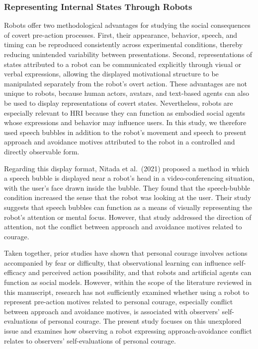 \subsubsection{Representing Internal States Through
Robots}\label{representing-internal-states-through-robots}

Robots offer two methodological advantages for studying the social
consequences of covert pre-action processes. First, their appearance,
behavior, speech, and timing can be reproduced consistently across
experimental conditions, thereby reducing unintended variability between
presentations. Second, representations of states attributed to a robot
can be communicated explicitly through visual or verbal expressions,
allowing the displayed motivational structure to be manipulated
separately from the robot's overt action. These advantages are not
unique to robots, because human actors, avatars, and text-based agents
can also be used to display representations of covert states.
Nevertheless, robots are especially relevant to HRI because they can
function as embodied social agents whose expressions and behavior may
influence users. In this study, we therefore used speech bubbles in
addition to the robot's movement and speech to present approach and
avoidance motives attributed to the robot in a controlled and directly
observable form.

Regarding this display format, Nitada et al.~(2021) proposed a method in
which a speech bubble is displayed near a robot's head in a
video-conferencing situation, with the user's face drawn inside the
bubble. They found that the speech-bubble condition increased the sense
that the robot was looking at the user. Their study suggests that speech
bubbles can function as a means of visually representing the robot's
attention or mental focus. However, that study addressed the direction
of attention, not the conflict between approach and avoidance motives
related to courage.

Taken together, prior studies have shown that personal courage involves
actions accompanied by fear or difficulty, that observational learning
can influence self-efficacy and perceived action possibility, and that
robots and artificial agents can function as social models. However,
within the scope of the literature reviewed in this manuscript, research
has not sufficiently examined whether using a robot to represent
pre-action motives related to personal courage, especially conflict
between approach and avoidance motives, is associated with observers'
self-evaluations of personal courage. The present study focuses on this
unexplored issue and examines how observing a robot expressing
approach-avoidance conflict relates to observers' self-evaluations of
personal courage.


